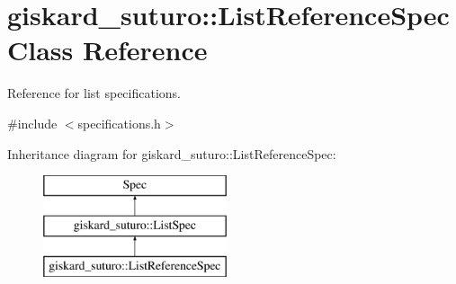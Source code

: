 \hypertarget{classgiskard__suturo_1_1ListReferenceSpec}{\section{giskard\-\_\-suturo\-:\-:List\-Reference\-Spec Class Reference}
\label{classgiskard__suturo_1_1ListReferenceSpec}
}


Reference for list specifications.  




{\ttfamily \#include $<$specifications.\-h$>$}

Inheritance diagram for giskard\-\_\-suturo\-:\-:List\-Reference\-Spec\-:\begin{figure}[H]
\begin{center}
\leavevmode
\includegraphics[height=3.000000cm]{classgiskard__suturo_1_1ListReferenceSpec}
\end{center}
\end{figure}
